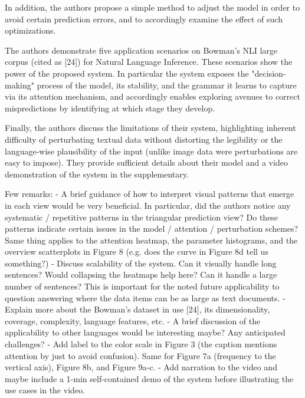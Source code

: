 In addition, the authors propose a simple method to adjust the model in order to avoid certain prediction errors, and to accordingly examine the effect of such optimizations.

The authors demonstrate five application scenarios on Bowman's NLI large corpus (cited as [24]) for Natural Language Inference.
These scenarios show the power of the proposed system. In particular the system exposes the "decision-making" process of the model, its stability, and the grammar it learns to capture via its attention mechanism, and accordingly enables exploring avenues to correct mispredictions by identifying at which stage they develop.

Finally, the authors discuss the limitations of their system, highlighting inherent difficulty of perturbating textual data without distorting the legibility or the language-wise plausibility of the input (unlike image data were perturbations are easy to impose). They provide sufficient details about their model and a video demonstration of the system in the supplementary.

Few remarks:
- A brief guidance of how to interpret visual patterns that emerge in each view would be very beneficial. In particular, did the authors notice any systematic / repetitive patterns in the triangular prediction view? Do these patterns indicate certain issues in the model / attention / perturbation schemes?
Same thing applies to the attention heatmap, the parameter histograms, and the overview scatterplots in Figure 8 (e.g. does the curve in Figure 8d tell us something?)
- Discuss scalability of the system. Can it visually handle long sentences? Would collapsing the heatmaps help here?
Can it handle a large number of sentences? This is important for the noted future applicability to question answering where the data items can be as large as text documents.
- Explain more about the Bowman's dataset in use [24], its dimensionality, coverage, complexity, language features, etc.
- A brief discussion of the applicability to other languages would be interesting maybe? Any anticipated challenges?
- Add label to the color scale in Figure 3 (the caption mentions attention by just to avoid confusion). Same for Figure 7a (frequency to the vertical axis), Figure 8b, and Figure 9a-c.
- Add narration to the video and maybe include a 1-min self-contained demo of the system before illustrating the use cases in the video.

